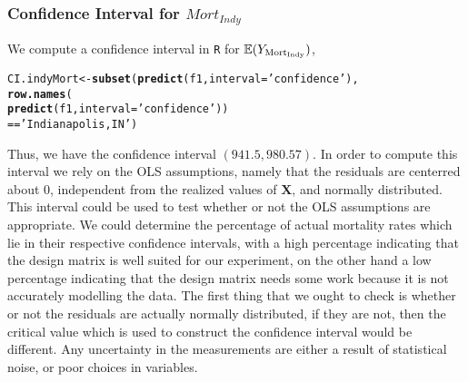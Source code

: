 \documentclass{amsart}\usepackage[]{graphicx}\usepackage[]{color}
\makeatletter
\newcommand{\hlstr}[1]{\textcolor[rgb]{0.192,0.494,0.8}{#1}}%
\newcommand{\hlopt}[1]{\textcolor[rgb]{0,0,0}{#1}}%
\newcommand{\hlstd}[1]{\textcolor[rgb]{0.345,0.345,0.345}{#1}}%
\newcommand{\hlkwb}[1]{\textcolor[rgb]{0.69,0.353,0.396}{#1}}%
\newcommand{\hlkwc}[1]{\textcolor[rgb]{0.333,0.667,0.333}{#1}}%
\newcommand{\hlkwd}[1]{\textcolor[rgb]{0.737,0.353,0.396}{\textbf{#1}}}%
\newenvironment{kframe}{%
 \def\at@end@of@kframe{}%
 \ifinner\ifhmode%
  \def\at@end@of@kframe{\end{minipage}}%
  \begin{minipage}{\columnwidth}%
 \fi\fi%
 \def\FrameCommand##1{\hskip\@totalleftmargin \hskip-\fboxsep
 \colorbox{shadecolor}{##1}\hskip-\fboxsep
     \hskip-\linewidth \hskip-\@totalleftmargin \hskip\columnwidth}%
 \MakeFramed {\advance\hsize-\width
   \@totalleftmargin\z@ \linewidth\hsize
   \@setminipage}}%
 {\par\unskip\endMakeFramed%
 \at@end@of@kframe}
\newenvironment{knitrout}{}{} %
\newcommand{\bvec}[1]{{\boldsymbol #1}}
\newcommand{\bX}{\bvec{X}}
\makeatother
\begin{document}
			\subsubsection{Confidence Interval for $Mort_{Indy}$} %
			\label{ssub:confidence_interval_for_mortality_in_indianapolis}
            We compute a confidence interval in \verb|R| for $\mathbb{E}(Y_{\rm Mort_{Indy}})$,
\begin{knitrout}
\color{fgcolor}\begin{kframe}
\begin{alltt}
    \hlstd{CI.indyMort} \hlkwb{<-} \hlkwd{subset}\hlstd{(}\hlkwd{predict}\hlstd{(f1,}\hlkwc{interval} \hlstd{=} \hlstr{'confidence'}\hlstd{),}
                          \hlkwd{row.names}\hlstd{(}
                              \hlkwd{predict}\hlstd{(f1,} \hlkwc{interval} \hlstd{=} \hlstr{'confidence'}\hlstd{))}
                          \hlopt{==} \hlstr{'Indianapolis, IN'}\hlstd{)}
\end{alltt}
\end{kframe}
\end{knitrout}

            Thus, we have the confidence interval $\left( 941.5, 980.57 \right)$.
            In order to compute this interval we rely on the OLS assumptions, namely that the residuals are centerred about 0, independent from the realized values of $\bX$, and normally distributed.
            This interval could be used to test whether or not the OLS assumptions are appropriate.
            We could determine the percentage of actual mortality rates which lie in their respective confidence intervals, with a high percentage indicating that the design matrix is well suited for our experiment, on the other hand a low percentage indicating that the design matrix needs some work because it is not accurately modelling the data.
            The first thing that we ought to check is whether or not the residuals are actually normally distributed, if they are not, then the critical value which is used to construct the confidence interval would be different.
            Any uncertainty in the measurements are either a result of statistical noise, or poor choices in variables.
\end{document}

